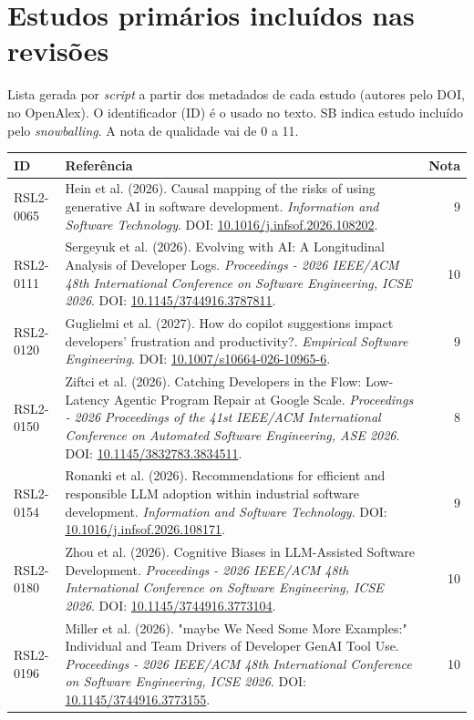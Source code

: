 \chapter{Estudos primários incluídos nas revisões}
\label{ap:estudos}

Lista gerada por \textit{script} a partir dos metadados de cada estudo (autores pelo DOI, no OpenAlex). O identificador (ID) é o usado no texto. SB indica estudo incluído pelo \textit{snowballing}. A nota de qualidade vai de 0 a 11.

\begin{small}
\begin{longtable}{lp{11.2cm}r}
\hline
\textbf{ID} & \textbf{Referência} & \textbf{Nota} \\ \hline\endhead
RSL2-0065 & Hein et al. (2026). Causal mapping of the risks of using generative AI in software development. \textit{Information and Software Technology}. DOI: \url{10.1016/j.infsof.2026.108202}. & 9 \\
RSL2-0111 & Sergeyuk et al. (2026). Evolving with AI: A Longitudinal Analysis of Developer Logs. \textit{Proceedings - 2026 IEEE/ACM 48th International Conference on Software Engineering, ICSE 2026}. DOI: \url{10.1145/3744916.3787811}. & 10 \\
RSL2-0120 & Guglielmi et al. (2027). How do copilot suggestions impact developers’ frustration and productivity?. \textit{Empirical Software Engineering}. DOI: \url{10.1007/s10664-026-10965-6}. & 9 \\
RSL2-0150 & Ziftci et al. (2026). Catching Developers in the Flow: Low-Latency Agentic Program Repair at Google Scale. \textit{Proceedings - 2026 Proceedings of the 41st IEEE/ACM International Conference on Automated Software Engineering, ASE 2026}. DOI: \url{10.1145/3832783.3834511}. & 8 \\
RSL2-0154 & Ronanki et al. (2026). Recommendations for efficient and responsible LLM adoption within industrial software development. \textit{Information and Software Technology}. DOI: \url{10.1016/j.infsof.2026.108171}. & 9 \\
RSL2-0180 & Zhou et al. (2026). Cognitive Biases in LLM-Assisted Software Development. \textit{Proceedings - 2026 IEEE/ACM 48th International Conference on Software Engineering, ICSE 2026}. DOI: \url{10.1145/3744916.3773104}. & 10 \\
RSL2-0196 & Miller et al. (2026). "maybe We Need Some More Examples:" Individual and Team Drivers of Developer GenAI Tool Use. \textit{Proceedings - 2026 IEEE/ACM 48th International Conference on Software Engineering, ICSE 2026}. DOI: \url{10.1145/3744916.3773155}. & 10 \\

\end{longtable}
\end{small}

